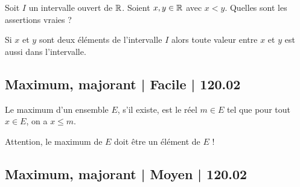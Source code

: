 \begin{question}

Soit $I$ un intervalle ouvert de $\mathbb{R}$. Soient $x,y \in\mathbb{R}$ avec $x < y$.
Quelles sont les assertions vraies ?
\begin{answers}



\end{answers}
\begin{explanations}
Si $x$ et $y$ sont deux éléments de l'intervalle $I$ alors toute valeur entre $x$ et $y$ est aussi dans l'intervalle.
\end{explanations}
\end{question}





\subsection{Maximum, majorant | Facile | 120.02}



\begin{question}

Le maximum d'un ensemble $E$, s'il existe, est le réel $m \in E$ tel que pour tout $x\in E$, on a $x \le m$.
\begin{answers}


    \good{L'ensemble $E = [-3,-1[$ n'admet pas de maximum.}

  
\end{answers}
\begin{explanations}
Attention, le maximum de $E$ doit être un élément de $E$ !
\end{explanations}
\end{question}

\subsection{Maximum, majorant | Moyen | 120.02}


